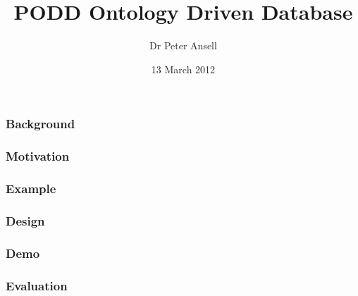 \documentclass[12pt]{beamer}
\title{PODD Ontology Driven Database}
\author{Dr Peter Ansell}
\institute{University of Queensland}
\date{13 March 2012}
\begin{document}
\begin{frame}
\titlepage
\end{frame}


\begin{frame}
\frametitle{Background} 

\end{frame}

\begin{frame}
\frametitle{Motivation} 

\end{frame}

\begin{frame}
\frametitle{Example} 

\end{frame}

\begin{frame}
\frametitle{Design} 

\end{frame}

\bgroup
\begin{frame}[plain]{}

\end{frame}
\egroup

\begin{frame}
\frametitle{Demo} 

\end{frame}

\begin{frame}
\frametitle{Evaluation}

\end{frame}
\end{document}
